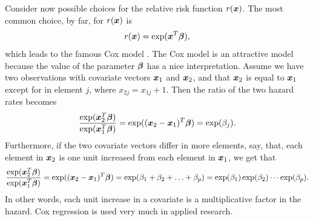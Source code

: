 Consider now possible choices for the relative risk function $r(\bm{x})$.
The most common choice, by far, for $r(\bm{x})$ is
\begin{equation*}
    r(\bm{x})=\exp(\bm{x}^T\boldsymbol{\beta}),
\end{equation*}
which leads to the famous Cox model \citep{cox-model}.
The Cox model is an attractive model because the value of the parameter $\boldsymbol{\beta}$ has a nice interpretation.
Assume we have two observations with covariate vectors $\bm{x}_1$ and $\bm{x}_2$, and that $\bm{x}_2$ is equal to $\bm{x}_1$ except for in element $j$, where $x_{2j}=x_{1j}+1$.
Then the ratio of the two hazard rates becomes
\begin{equation*}
    \frac{\exp(\bm{x}_2^T\boldsymbol{\beta})}{\exp(\bm{x}_1^T\boldsymbol{\beta})}=\exp((\bm{x}_2-\bm{x}_1)^T\boldsymbol{\beta})=\exp(\beta_j).
\end{equation*}
Furthermore, if the two covariate vectors differ in more elements, say, that, each element in $\bm{x}_2$ is one unit increased from each element in $\bm{x}_1$, we get that
\begin{equation*}
    \frac{\exp(\bm{x}_2^T\boldsymbol{\beta})}{\exp(\bm{x}_1^T\boldsymbol{\beta})}=\exp((\bm{x}_2-\bm{x}_1)^T\boldsymbol{\beta})=\exp(\beta_1+\beta_2+\ldots+\beta_p)=\exp(\beta_1)\exp(\beta_2)\cdots\exp(\beta_p).
\end{equation*}
In other words, each unit increase in a covariate is a multiplicative factor in the hazard.
Cox regression is used very much in applied research.


